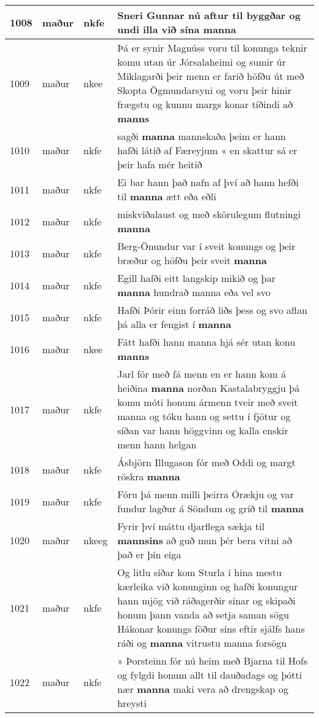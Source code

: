\documentclass{article}
\begin{document}
\begin{longtable}{p{1cm}|p{1cm}|p{1cm}|p{13cm}}
\hline
1008&maður&nkfe&Sneri Gunnar nú aftur til byggðar og undi illa við sína \textbf{manna} \\
\hline
1009&maður&nkee&Þá er synir Magnúss voru til konunga teknir komu utan úr Jórsalaheimi og sumir úr Miklagarði þeir menn er farið höfðu út með Skopta Ögmundarsyni og voru þeir hinir frægstu og kunnu margs konar tíðindi að \textbf{manns} \\
\hline
1010&maður&nkfe&sagði \textbf{manna} mannskaða þeim er hann hafði látið af Færeyjum « en skattur sá er þeir hafa mér heitið\\
\hline
1011&maður&nkfe&Ei bar hann það nafn af því að hann hefði til \textbf{manna} ætt eða eðli\\
\hline
1012&maður&nkfe&miskviðalaust og með skörulegum flutningi \textbf{manna} \\
\hline
1013&maður&nkfe&Berg-Önundur var í sveit konungs og þeir bræður og höfðu þeir sveit \textbf{manna} \\
\hline
1014&maður&nkfe&Egill hafði eitt langskip mikið og þar \textbf{manna} hundrað manna eða vel svo\\
\hline
1015&maður&nkfe&Hafði Þórir einn forráð liðs þess og svo aflan þá alla er fengist í \textbf{manna} \\
\hline
1016&maður&nkee&Fátt hafði hann manna hjá sér utan konu \textbf{manns} \\
\hline
1017&maður&nkfe&Jarl fór með fá menn en er hann kom á heiðina \textbf{manna} norðan Kastalabryggju þá komu móti honum ármenn tveir með sveit manna og tóku hann og settu í fjötur og síðan var hann höggvinn og kalla enskir menn hann helgan\\
\hline
1018&maður&nkfe&Ásbjörn Illugason fór með Oddi og margt röskra \textbf{manna} \\
\hline
1019&maður&nkfe&Fóru þá menn milli þeirra Órækju og var fundur lagður á Söndum og grið til \textbf{manna} \\
\hline
1020&maður&nkeeg&Fyrir því máttu djarflega sækja til \textbf{mannsins} að guð mun þér bera vitni að það er þín eiga\\
\hline
1021&maður&nkfe&Og litlu síðar kom Sturla í hina mestu kærleika við konunginn og hafði konungur hann mjög við ráðagerðir sínar og skipaði honum þann vanda að setja saman sögu Hákonar konungs föður síns eftir sjálfs hans ráði og \textbf{manna} vitrustu manna forsögn\\
\hline
1022&maður&nkfe&» Þorsteinn fór nú heim með Bjarna til Hofs og fylgdi honum allt til dauðadags og þótti nær \textbf{manna} maki vera að drengskap og hreysti\\

\end{longtable}
\end{document}

